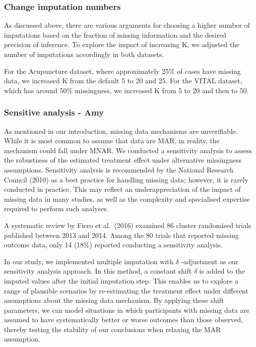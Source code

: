 \documentclass{article}
\begin{document}
\subsubsection{Change imputation
numbers}\label{change-imputation-numbers}

As discussed above, there are various arguments for choosing a higher
number of imputations based on the fraction of missing information and
the desired precision of inference. To explore the impact of increasing
K, we adjusted the number of imputations accordingly in both datasets.

For the Acupuncture dataset, where approximately 25\% of cases have
missing data, we increased K from the default 5 to 20 and 25. For the
VITAL dataset, which has around 50\% missingness, we increased K from 5
to 20 and then to 50.

\subsubsection{Sensitive analysis - Amy}\label{sensitive-analysis---amy}

As mentioned in our introduction, missing data mechanisms are
unverifiable. While it is most common to assume that data are MAR, in
reality, the mechanism could fall under MNAR. We conducted a sensitivity
analysis to assess the robustness of the estimated treatment effect
under alternative missingness assumptions. Sensitivity analysis is
recommended by the National Research Council (2010) as a best practice
for handling missing data; however, it is rarely conducted in practice.
This may reflect an underappreciation of the impact of missing data in
many studies, as well as the complexity and specialised expertise
required to perform such analyses.

A systematic review by Fiero et al.~(2016) examined 86 cluster
randomised trials published between 2013 and 2014. Among the 80 trials
that reported missing outcome data, only 14 (18\%) reported conducting a
sensitivity analysis.

In our study, we implemented multiple imputation with \(\delta\)
-adjustment as our sensitivity analysis approach. In this method, a
constant shift \(\delta\) is added to the imputed values after the
initial imputation step. This enables us to explore a range of plausible
scenarios by re-estimating the treatment effect under different
assumptions about the missing data mechanism. By applying these shift
parameters, we can model situations in which participants with missing
data are assumed to have systematically better or worse outcomes than
those observed, thereby testing the stability of our conclusions when
relaxing the MAR assumption.
\end{document}
